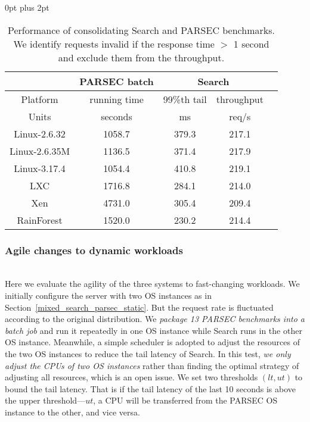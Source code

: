 \documentclass[pageno]{jpaper}
\begin{document}
\begin{table}[t]
\renewcommand{\arraystretch}{1.1}
\setlength{\abovecaptionskip}{3pt}
\setlength{\belowcaptionskip}{0pt}
\setlength{\textfloatsep} {0pt plus 2pt}
\setlength{\tabcolsep}{5pt}
\centering
\caption{Performance of consolidating Search and PARSEC benchmarks. We identify requests invalid if the response time $>$ 1 second and exclude them from the throughput.}
\label{table_consolidation_results}
\begin{lrbox}{\tablebox}
\begin{tabular}{|c|c|c|c|c|}
\hline
& PARSEC batch & \multicolumn{2}{c|}{Search} \\ \hline
Platform &  running time & 99\%th tail & throughput \\ \hline
Units & seconds & ms & req/s \\ \hline
Linux-2.6.32 & 1058.7 & 379.3 & 217.1\\ \hline
Linux-2.6.35M & 1136.5 & 371.4 & 217.9  \\ \hline
Linux-3.17.4 & 1054.4 & 410.8  & 219.1 \\ \hline
LXC & 1716.8 & 284.1 & 214.0 \\ \hline
Xen & 4731.0 & 305.4 & 209.4\\ \hline
RainForest& 1520.0 & 230.2 & 214.4\\ \hline
\end{tabular}
\end{lrbox}
\scalebox{0.8}{\usebox{\tablebox}}
\end{table}

\subsubsection{Agile changes to dynamic workloads}\label{agility}
\textrm{\\} Here we evaluate the agility of the three systems to fast-changing workloads.
We initially configure the server with two OS instances as in Section~\ref{mixed_search_parsec_static}. But the request rate is fluctuated according to the original distribution. We \emph{package 13 PARSEC benchmarks into a batch job} and run it repeatedly in one OS instance while Search runs in the other OS instance. Meanwhile, a simple scheduler is adopted to adjust the resources of the two OS instances to reduce the tail latency of Search. In this test, \emph{we only adjust the CPUs of two OS instances} rather than finding the optimal strategy of adjusting all resources, which is an open issue. We set two thresholds $(lt, ut)$ to bound the tail latency. That is if the tail latency of the last 10 seconds is above the upper threshold---$ut$, a CPU will be transferred from the PARSEC OS instance to the other, and vice versa.
\end{document}
